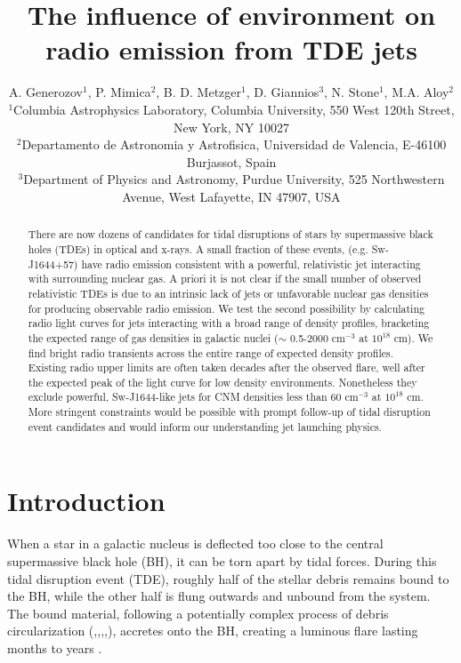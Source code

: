 \documentclass[usenatbib,fleqn]{mnras}
\title{The influence of environment on radio emission from TDE jets}
\author[Generozov et al.]{ A. Generozov$^{1}$, P. Mimica$^{2}$,
  B. D. Metzger$^{1}$,
  D. Giannios$^{3}$, 
  N. Stone$^{1}$,
  M.A. Aloy$^{2}$ 
  \\
  $^{1}$Columbia Astrophysics Laboratory, Columbia University, 550 West 120th Street, New York, NY 10027\\
  $^{2}$Departamento de Astronomia y Astrofisica, Universidad de Valencia, E-46100 Burjassot, Spain\\
  $^{3}$Department of Physics and Astronomy, Purdue University, 525
  Northwestern Avenue, West Lafayette, IN 47907, USA}
\begin{document}
\maketitle
\begin{abstract}
  There are now dozens of candidates for tidal disruptions of stars by
  supermassive black holes (TDEs) in optical and x-rays. A small
  fraction of these events, (e.g. Sw-J1644+57) have radio emission
  consistent with a powerful, relativistic jet interacting with
  surrounding nuclear gas. A priori it is not clear if the small
  number of observed relativistic TDEs is due to an intrinsic lack of jets
  or unfavorable nuclear gas densities for producing observable radio
  emission. We test the second possibility by calculating radio
  light curves for jets interacting with a broad range of density
  profiles, bracketing the expected range of gas densities in galactic
  nuclei ($\sim$ 0.5-2000 cm$^{-3}$ at $10^{18}$ cm). We find bright radio
  transients across the entire range of expected density
  profiles. Existing radio upper limits are often taken decades after
  the observed flare, well after the expected peak of the light curve
  for low density environments. Nonetheless they exclude powerful,
  Sw-J1644-like jets for CNM densities less than 60 cm$^{-3}$ at
  $10^{18}$ cm. More stringent constraints would be possible with
  prompt follow-up of tidal disruption event candidates and would
  inform our understanding jet launching physics.
\end{abstract}
\section{Introduction}
\label{sec:intro}
When a star in a galactic nucleus is deflected too close to the
central supermassive black hole (BH), it can be torn apart by tidal
forces.  During this tidal disruption event (TDE), roughly half of the
stellar debris remains bound to the BH, while the other half is flung
outwards and unbound from the system.  The bound material, following a
potentially complex process of debris circularization
(\citealt{Guillochon+2013},\citealt{Hayasaki+2013},\citealt{Hayasaki+2015},\citealt{Shiokawa+2015},\citealt{Bonnerot+2015}),
accretes onto the BH, creating a luminous flare lasting months to
years \citep{Hills1975, Carter+1982, Rees1988}.
\end{document}
